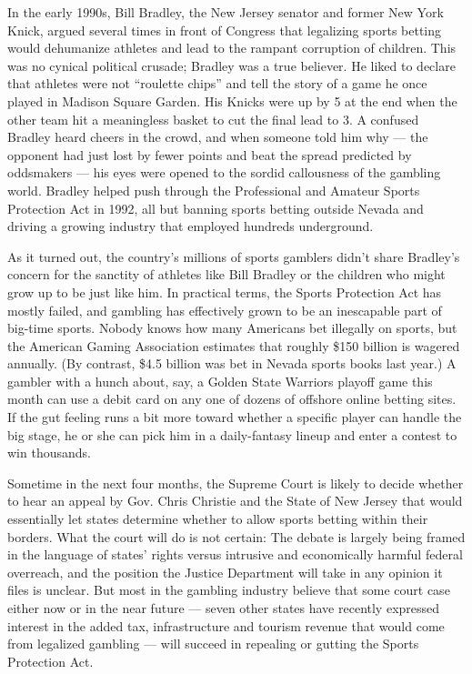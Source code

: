 In the early 1990s, Bill Bradley, the New Jersey senator and former New
York Knick, argued several times in front of Congress that legalizing
sports betting would dehumanize athletes and lead to the rampant
corruption of children. This was no cynical political crusade; Bradley
was a true believer. He liked to declare that athletes were not
``roulette chips'' and tell the story of a game he once played in
Madison Square Garden. His Knicks were up by 5 at the end when the other
team hit a meaningless basket to cut the final lead to 3. A confused
Bradley heard cheers in the crowd, and when someone told him why --- the
opponent had just lost by fewer points and beat the spread predicted by
oddsmakers --- his eyes were opened to the sordid callousness of the
gambling world. Bradley helped push through the Professional and Amateur
Sports Protection Act in 1992, all but banning sports betting outside
Nevada and driving a growing industry that employed hundreds
underground.

As it turned out, the country's millions of sports gamblers didn't share
Bradley's concern for the sanctity of athletes like Bill Bradley or the
children who might grow up to be just like him. In practical terms, the
Sports Protection Act has mostly failed, and gambling has effectively
grown to be an inescapable part of big-time sports. Nobody knows how
many Americans bet illegally on sports, but the American Gaming
Association estimates that roughly \$150 billion is wagered annually.
(By contrast, \$4.5 billion was bet in Nevada sports books last year.) A
gambler with a hunch about, say, a Golden State Warriors playoff game
this month can use a debit card on any one of dozens of offshore online
betting sites. If the gut feeling runs a bit more toward whether a
specific player can handle the big stage, he or she can pick him in a
daily-fantasy lineup and enter a contest to win thousands.

Sometime in the next four months, the Supreme Court is likely to decide
whether to hear an appeal by Gov. Chris Christie and the State of New
Jersey that would essentially let states determine whether to allow
sports betting within their borders. What the court will do is not
certain: The debate is largely being framed in the language of states'
rights versus intrusive and economically harmful federal overreach, and
the position the Justice Department will take in any opinion it files is
unclear. But most in the gambling industry believe that some court case
either now or in the near future --- seven other states have recently
expressed interest in the added tax, infrastructure and tourism revenue
that would come from legalized gambling --- will succeed in repealing or
gutting the Sports Protection Act.

